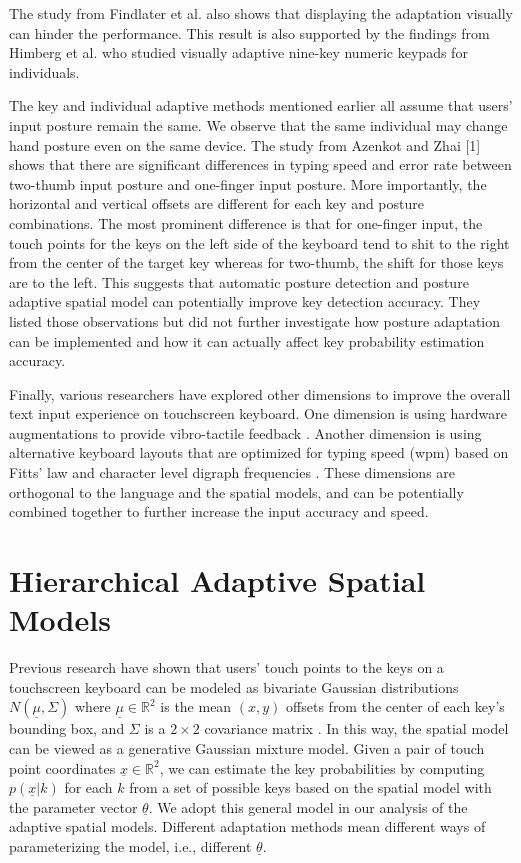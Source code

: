 \documentclass{sigchi}
\begin{document}
The study from Findlater et al. also shows that displaying the adaptation visually can hinder
the performance. This result is also supported by the findings from Himberg et al. \cite{Himberg:2003} who 
studied visually adaptive nine-key numeric keypads for individuals.  

The key and individual adaptive methods mentioned earlier all assume that users' input posture
remain the same. We observe that the same individual may change hand posture even on the same device. 
The study from Azenkot and Zhai [1] shows that there are significant differences 
in typing speed and error rate between two-thumb input posture and one-finger 
input posture. More importantly, the horizontal and vertical offsets are 
different for each key and posture combinations. The most prominent difference is that for
one-finger input, the touch points for the keys on the left side of the keyboard tend to
shit to the right from the center of the target key whereas for two-thumb, the shift for those
keys are to the left. This suggests that automatic posture detection and posture
adaptive spatial model can potentially improve key detection accuracy. They listed those observations but
did not further investigate how posture adaptation can be implemented and how it can actually affect key probability estimation accuracy.

Finally, various researchers have explored other dimensions to improve the overall
text input experience on touchscreen keyboard. One dimension is using hardware
augmentations to provide vibro-tactile feedback \cite{Brewster:2007, Hoggan:2008}. 
Another dimension is using alternative keyboard layouts that are optimized for typing speed (wpm)
based on Fitts' law and character level digraph frequencies \cite{Zhai:2000, MacKenzie:1999}.
These dimensions are orthogonal to the language and the spatial models, and can be potentially 
combined together to further increase the input accuracy and speed.

\section{Hierarchical Adaptive Spatial Models}
Previous research have shown that users' touch points to the keys on a touchscreen
keyboard can be modeled as bivariate Gaussian distributions $N(\underline\mu, \Sigma)$
where $\underline\mu \in \mathbb{R}^2$ is the mean $(x, y)$ offsets from the center of
each key's bounding box, and $\Sigma$ is a $2\times 2$ covariance matrix  
\cite{Azenkot:2012, Goodman:2002, Rashid:2008}.
In this way, the spatial model can be viewed as a generative Gaussian mixture
model.  Given a pair of touch point coordinates $\underline x \in \mathbb{R}^2$, 
we can estimate the key probabilities by computing
$p(\underline x | k)$ for each $k$ from a set of possible keys based on the
spatial model with the parameter vector $\underline\theta$.
We adopt this general model in our analysis of the adaptive spatial models.
Different adaptation methods mean different ways of parameterizing the model, i.e., different
$\underline\theta$.
\end{document}
